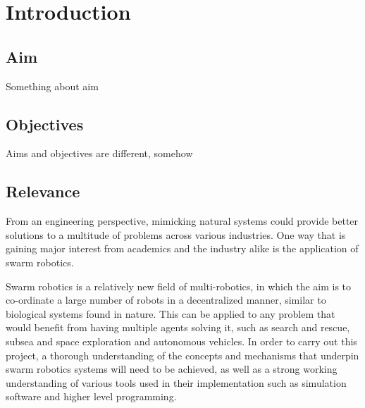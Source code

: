 \chapter{Introduction}
\label{chap:Introduction}

\section{Aim}
Something about aim


\section{Objectives}
Aims and objectives are different, somehow

\section{Relevance}

From an engineering perspective, mimicking natural systems could provide better solutions to a multitude of problems across various industries. One way that is gaining major interest from academics and the industry alike is the application of swarm robotics.

Swarm robotics is a relatively new field of multi-robotics, in which the aim is to co-ordinate a large number of robots in a decentralized manner, similar to biological systems found in nature. This can be applied to any problem that would benefit from having multiple agents solving it, such as search and rescue, subsea and space exploration and autonomous vehicles. In order to carry out this project, a thorough understanding of the concepts and mechanisms that underpin swarm robotics systems will need to be achieved, as well as a strong working understanding of various tools used in their implementation such as simulation software and higher level programming.
